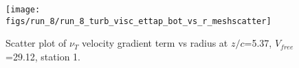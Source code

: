 \begin{figure}[H]
\centering
\texttt{[image: figs/run\_8/run\_8\_turb\_visc\_ettap\_bot\_vs\_r\_meshscatter]}
\caption{Scatter plot of $\nu_T$ velocity gradient term vs radius at $z/c$=5.37, $V_{free}$=29.12, station 1.}
\label{fig:run_8_turb_visc_ettap_bot_vs_r_meshscatter}
\end{figure}


